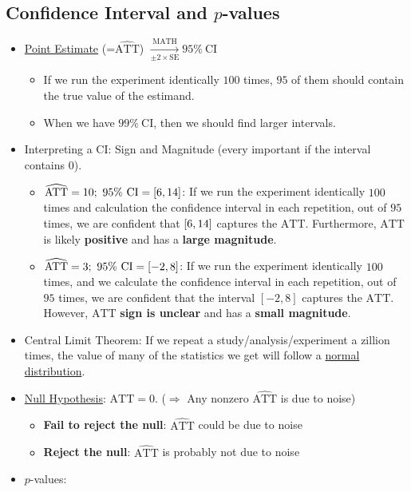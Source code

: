 \documentclass[10pt, letterpaper]{article}
\def\ATT{\mathrm{ATT}}
\def\SE{\mathrm{SE}}
\def\CI{\mathrm{CI}}
\begin{document}
\begin{multicols}{2}
\section*{Confidence Interval and $p$-values}
\begin{itemize}
	\item \underline{Point Estimate} (=$\widehat{\ATT}$) $\xrightarrow[\pm 2\times\SE]{\text{MATH}}95\%\ \CI$
	\begin{itemize}
		\item If we run the experiment identically $100$ times, $95$ of them should contain the true value of the estimand. 
		\item When we have $99\%\ \CI$, then we should find larger intervals. 
	\end{itemize}
	\item Interpreting a $\CI$: Sign and Magnitude (every important if the interval contains $0$).
	\begin{itemize}
		\item $\widehat{\ATT}=10;\ 95\%\ \CI=\qty[6,14]$: If we run the experiment identically $100$ times and calculation the confidence interval in each repetition, out of $95$ times, we are confident that $\qty[6,14]$ captures the $\ATT$. Furthermore, $\ATT$ is likely \textbf{positive} and has a \textbf{large magnitude}. 
		\item $\widehat{\ATT}=3;\ 95\%\ \CI=\qty[-2, 8]$: If we run the experiment identically $100$ times, and we calculate the confidence interval in each repetition, out of $95$ times, we are confident that the interval $[-2, 8]$ captures the $\ATT$. However, $\ATT$ \textbf{sign is unclear} and has a \textbf{small magnitude}.
	\end{itemize}
	\item Central Limit Theorem: If we repeat a study/analysis/experiment a zillion times, the value of many of the statistics we get will follow a \underline{normal distribution}.
	\item \underline{Null Hypothesis}: $\ATT=0$. ($\Rightarrow$ Any nonzero $\widehat{\ATT}$ is due to noise)
	\begin{itemize}
		\item \textbf{Fail to reject the null}: $\widehat{\ATT}$ could be due to noise
		\item \textbf{Reject the null}: $\widehat{\ATT}$ is probably not due to noise
	\end{itemize}
	\item $p$-values: 
	\begin{itemize}

\end{itemize}
\end{itemize}
\end{multicols}
\end{document}
